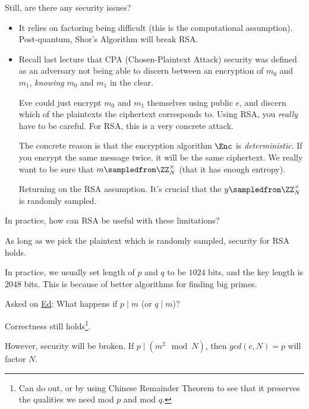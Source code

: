 \begin{ques*}
    Still, are there any security issues?
\end{ques*}
\begin{itemize}
    \item It relies on factoring being difficult (this is the computational assumption). Post-quantum, Shor's Algorithm will break RSA.
    \item Recall last lecture that CPA (Chosen-Plaintext Attack) security was defined as an adversary not being able to discern between an encryption of $m_0$ and $m_1$, \emph{knowing} $m_0$ and $m_1$ in the clear.

          Eve could just encrypt $m_0$ and $m_1$ themselves using public $e$, and discern which of the plaintexts the ciphertext corresponds to. Using RSA, you \emph{really} have to be careful. For RSA, this is a very concrete attack.

          The concrete reason is that the encryption algorithm $\Enc$ is \emph{deterministic}. If you encrypt the same message twice, it will be the same ciphertext. We really want to be sure that $m\sampledfrom \ZZ_N^\times$ (that it has enough entropy).

          Returning on the RSA assumption. It's crucial that the $y\sampledfrom \ZZ_N^\times$ is randomly sampled.
\end{itemize}

\begin{ques*}
    In practice, how can RSA be useful with these limitations?
\end{ques*}

As long as we pick the plaintext which is randomly sampled, security for RSA holds.

\begin{remark*}
    In practice, we usually set length of $p$ and $q$ to be $1024$ bits, and the key length is $2048$ bits. This is because of better algorithms for finding big primes.
\end{remark*}

\begin{ques*}
    Asked on \href{https://edstem.org/us/courses/33693/discussion/2483699}{Ed}: What happens if $p\mid m$ (or $q\mid m$)?
\end{ques*}

Correctness still holds\footnote{Can do out, or by using Chinese Remainder Theorem to see that it preserves the qualities we need mod $p$ and mod $q$. }.

However, security will be broken. If $p\mid (m^2\mod N)$, then $gcd(c, N) = p$ will factor $N$.

